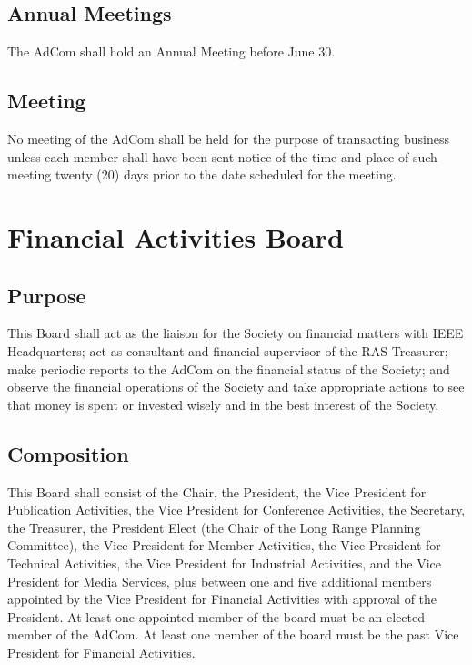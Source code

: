 \documentclass[10pt]{article}
\begin{document}
\subsection{Annual Meetings}
The AdCom shall hold an Annual Meeting before June 30.


\subsection{Meeting}

No meeting of the AdCom shall be held for the purpose of transacting business unless each member shall have been sent notice of the time and place of such meeting twenty (20) days prior to the date scheduled for the meeting. 


\section{Financial Activities Board}
\label{FAB}

\subsection{Purpose}
This Board shall act as the liaison for the Society on financial matters with IEEE Headquarters; act as consultant and financial supervisor of the RAS Treasurer; make periodic reports to the AdCom on the financial status of the Society; and observe the financial operations of the Society and take appropriate actions to see that money is spent or invested wisely and in the best interest of the Society.


\subsection{Composition}
This Board shall consist of the Chair, the President, the Vice President for Publication Activities, the Vice President for Conference Activities, the Secretary, the Treasurer, the President Elect (the Chair of the Long Range Planning Committee), the Vice President for Member Activities, the Vice President for Technical Activities, the Vice President for Industrial Activities, and the Vice President for Media Services, plus between one and five additional members appointed by the Vice President for Financial Activities with approval of the President. At least one appointed member of the board must be an elected member of the AdCom. At least one member of the board must be the past Vice President for Financial Activities.
\end{document}
